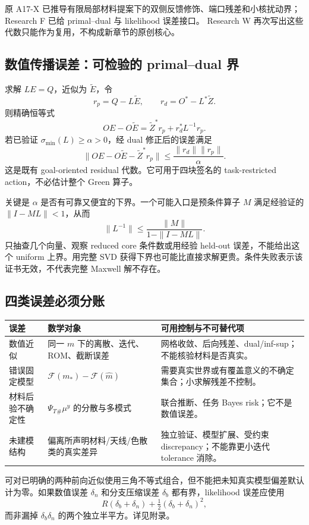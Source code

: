 原 A17-X 已推导有限局部材料提案下的双侧反馈修饰、端口残差和小核扰动界；Research F 已给 primal--dual 与 likelihood 误差接口。\cite{R_A17X,R_F} Research W 再次写出这些代数只能作为复用，不构成新章节的原创核心。

\subsection{数值传播误差：可检验的 primal--dual 界}
求解 $LE=Q$，近似为 $\widetilde E$，令
\[
r_p=Q-L\widetilde E,\qquad
r_d=O^*-L^*\widetilde Z.
\]
则精确恒等式
\[
OE-O\widetilde E=
\widetilde Z^*r_p+r_d^*L^{-1}r_p.
\]
若已验证 $\sigma_{\min}(L)\ge\alpha>0$，经 dual 修正后的误差满足
\[
\|OE-O\widetilde E-\widetilde Z^*r_p\|
\le\frac{\|r_d\|\|r_p\|}{\alpha}.
\]
这是既有 goal-oriented residual 代数。它可用于四块签名的 task-restricted action，不必估计整个 Green 算子。

关键是 $\alpha$ 是否有可靠又便宜的下界。一个可能入口是预条件算子 $M$ 满足经验证的 $\|I-ML\|<1$，从而
\[
\|L^{-1}\|\le \frac{\|M\|}{1-\|I-ML\|}.
\]
只抽查几个向量、观察 reduced core 条件数或用经验 held-out 误差，不能给出这个 uniform 上界。用完整 SVD 获得下界也可能比直接求解更贵。条件失败表示该证书无效，不代表完整 Maxwell 解不存在。

\subsection{四类误差必须分账}
\begin{longtable}{p{27mm}p{54mm}p{67mm}}
\toprule
误差 & 数学对象 & 可用控制与不可替代项\\
\midrule
数值近似 & 同一 $m$ 下的离散、迭代、ROM、截断误差 & 网格收敛、后向残差、dual/inf-sup；不能核验材料是否真实。\\
错误固定模型 & $\mathcal F(m_*)-\mathcal F(\widehat m)$ & 需要真实世界或有覆盖意义的不确定集合；小求解残差不控制。\\
材料后验不确定性 & $\Psi_T{}_\#\mu^y$ 的分散与多模式 & 联合推断、任务 Bayes risk；它不是数值误差。\\
未建模结构 & 偏离所声明材料/天线/色散类的真实差异 & 独立验证、模型扩展、受约束 discrepancy；不能靠更小迭代 tolerance 消除。\\
\bottomrule
\end{longtable}
可对已明确的两种前向近似使用三角不等式组合，但不能把未知真实模型偏差默认计为零。如果数值误差 $\delta_n$ 和分支压缩误差 $\delta_b$ 都有界，likelihood 误差应使用
\[
R(\delta_b+\delta_n)+\tfrac12(\delta_b+\delta_n)^2,
\]
而非漏掉 $\delta_b\delta_n$ 的两个独立半平方。详见附录。

